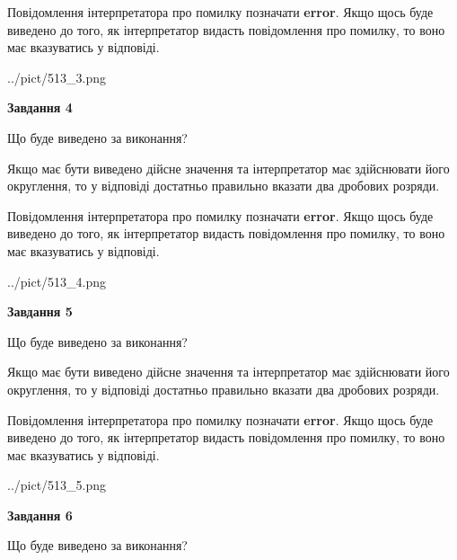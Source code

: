 \documentclass[12pt, ukrainian]{article}
\begin{document}
{\begin {Large}
Повідомлення інтерпретатора про помилку позначати \textbf{error}.
Якщо щось буде виведено до того, як інтерпретатор видасть повідомлення про помилку, 
то воно має вказуватись у відповіді. \par

\begin{center}
	{../pict/513_3.png}
\end{center}
\newpage

{\begin {center}\textbf{Завдання 4}\end {center}}\par
Що буде виведено за виконання? \par

Якщо має бути виведено дійсне значення та інтерпретатор має здійснювати його округлення, 
то у відповіді достатньо правильно вказати два дробових розряди.

Повідомлення інтерпретатора про помилку позначати \textbf{error}.
Якщо щось буде виведено до того, як інтерпретатор видасть повідомлення про помилку, 
то воно має вказуватись у відповіді. \par

\begin{center}
	{../pict/513_4.png}
\end{center}
\newpage

{\begin {center}\textbf{Завдання 5}\end {center}}\par
Що буде виведено за виконання? \par

Якщо має бути виведено дійсне значення та інтерпретатор має здійснювати його округлення, 
то у відповіді достатньо правильно вказати два дробових розряди.

Повідомлення інтерпретатора про помилку позначати \textbf{error}.
Якщо щось буде виведено до того, як інтерпретатор видасть повідомлення про помилку, 
то воно має вказуватись у відповіді. \par

\begin{center}
	{../pict/513_5.png}
\end{center}
\newpage

{\begin {center}\textbf{Завдання 6}\end {center}}\par
Що буде виведено за виконання? \par


\end{Large}}
\end{document}
